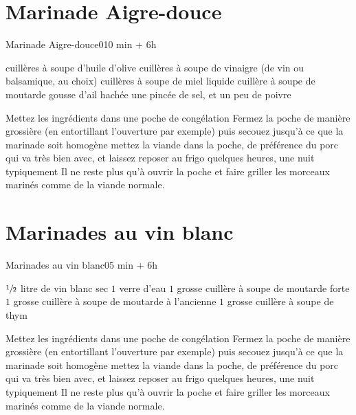 {\section{Marinade Aigre-douce}
\begin{recette}{Marinade Aigre-douce}{0}{10 min + 6h}{}
\begin{ingredients}
 cuillères à soupe d'huile d'olive
 cuillères à soupe de vinaigre (de vin ou balsamique, au choix)
 cuillères à soupe de miel liquide
 cuillère à soupe de moutarde
 gousse d'ail hachée
\ingredient une pincée de sel, et un peu de poivre
\end{ingredients}

\begin{preparation}
\etape Mettez les ingrédients dans une poche de congélation
\etape Fermez la poche de manière grossière (en entortillant l'ouverture par exemple) puis secouez jusqu'à ce que la marinade 
soit homogène
\etape mettez la viande dans la poche, de préférence du porc qui va très bien avec, et laissez reposer au frigo quelques heures, 
une nuit typiquement
\etape Il ne reste plus qu'à ouvrir la poche et faire griller les morceaux marinés comme de la viande normale.
\end{preparation}
\end{recette}

\section{Marinades au vin blanc}
\begin{recette}{Marinades au vin blanc}{0}{5 min + 6h}{}
\begin{ingredients}
\ingredient $\sfrac{1}{2}$ litre de vin blanc sec
\ingredient $1$ verre d'eau
\ingredient $1$ grosse cuillère à soupe de moutarde forte
\ingredient $1$ grosse cuillère à soupe de moutarde à l'ancienne
\ingredient $1$ grosse cuillère à soupe de thym
\end{ingredients}

\begin{preparation}
\etape Mettez les ingrédients dans une poche de congélation
\etape Fermez la poche de manière grossière (en entortillant l'ouverture par exemple) puis secouez jusqu'à ce que la marinade 
soit homogène
\etape mettez la viande dans la poche, de préférence du porc qui va très bien avec, et laissez reposer au frigo quelques heures, 
une nuit typiquement
\etape Il ne reste plus qu'à ouvrir la poche et faire griller les morceaux marinés comme de la viande normale.
\end{preparation}


\end{recette}}
